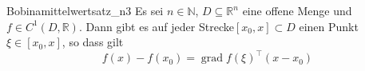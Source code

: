 \documentclass{book}
\begin{document}
\begin{ejem}{Bobina}{mittelwertsatz_n3}
	Es sei $n\in\mathbb{N}$, $D\subseteq\mathbb{R}^n$ eine offene Menge und$f\in C^{1}(D,\mathbb{R})$. Dann gibt es auf jeder Strecke$[x_0,x]\subset D$ einen Punkt $\xi\in[x_0,x]$, so dass gilt\begin{equation*}f(x)-f(x_0) = \operatorname{grad} f(\xi)^{\top}(x-x_0)\end{equation*}
\end{ejem}
\end{document}

